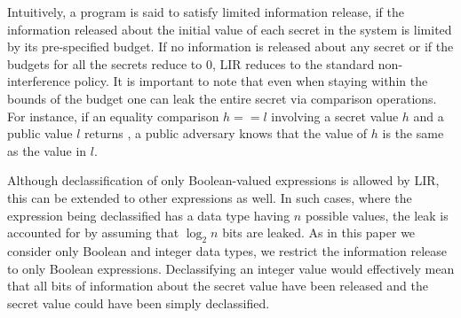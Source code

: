 Intuitively, a program is said to satisfy limited information release,
if the information released about the initial value of each secret in
the system is limited by its pre-specified budget. If no information 
is released about any secret or if the budgets for all the secrets 
reduce to $0$, LIR reduces to the standard
non-interference policy. It is important to note that even when
staying within the bounds of the budget one can leak the entire secret
via comparison operations. For instance, if an equality comparison
$h==l$ involving a secret value $h$ and a public value $l$ 
returns , a public adversary knows that the value of $h$ is
the same as the value in $l$. 

Although declassification of only Boolean-valued expressions is 
allowed by LIR, this can be extended to other expressions as well. 
In such cases, where the expression being declassified has a 
data type having $n$ possible values, the leak is 
accounted for by assuming that $\log_{2}n$ bits are leaked. 
As in this paper we consider only Boolean and integer data types, 
we restrict the information release to only Boolean expressions.  
Declassifying an integer value would effectively mean that all bits 
of information about the secret value have been released and the 
secret value could have been simply declassified.



